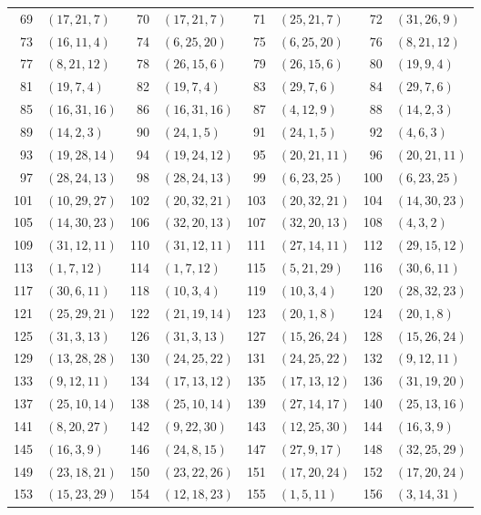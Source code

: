 \begin{longtable}{@{}r@{\quad}l@{\qquad}r@{\quad}l@{\qquad}r@{\quad}l@{\qquad}r@{\quad}l@{}}
69 & $(17,21,7)$ & 70 & $(17,21,7)$ & 71 & $(25,21,7)$ & 72 & $(31,26,9)$\\
73 & $(16,11,4)$ & 74 & $(6,25,20)$ & 75 & $(6,25,20)$ & 76 & $(8,21,12)$\\
77 & $(8,21,12)$ & 78 & $(26,15,6)$ & 79 & $(26,15,6)$ & 80 & $(19,9,4)$\\
81 & $(19,7,4)$ & 82 & $(19,7,4)$ & 83 & $(29,7,6)$ & 84 & $(29,7,6)$\\
85 & $(16,31,16)$ & 86 & $(16,31,16)$ & 87 & $(4,12,9)$ & 88 & $(14,2,3)$\\
89 & $(14,2,3)$ & 90 & $(24,1,5)$ & 91 & $(24,1,5)$ & 92 & $(4,6,3)$\\
93 & $(19,28,14)$ & 94 & $(19,24,12)$ & 95 & $(20,21,11)$ & 96 & $(20,21,11)$\\
97 & $(28,24,13)$ & 98 & $(28,24,13)$ & 99 & $(6,23,25)$ & 100 & $(6,23,25)$\\
101 & $(10,29,27)$ & 102 & $(20,32,21)$ & 103 & $(20,32,21)$ & 104 & $(14,30,23)$\\
105 & $(14,30,23)$ & 106 & $(32,20,13)$ & 107 & $(32,20,13)$ & 108 & $(4,3,2)$\\
109 & $(31,12,11)$ & 110 & $(31,12,11)$ & 111 & $(27,14,11)$ & 112 & $(29,15,12)$\\
113 & $(1,7,12)$ & 114 & $(1,7,12)$ & 115 & $(5,21,29)$ & 116 & $(30,6,11)$\\
117 & $(30,6,11)$ & 118 & $(10,3,4)$ & 119 & $(10,3,4)$ & 120 & $(28,32,23)$\\
121 & $(25,29,21)$ & 122 & $(21,19,14)$ & 123 & $(20,1,8)$ & 124 & $(20,1,8)$\\
125 & $(31,3,13)$ & 126 & $(31,3,13)$ & 127 & $(15,26,24)$ & 128 & $(15,26,24)$\\
129 & $(13,28,28)$ & 130 & $(24,25,22)$ & 131 & $(24,25,22)$ & 132 & $(9,12,11)$\\
133 & $(9,12,11)$ & 134 & $(17,13,12)$ & 135 & $(17,13,12)$ & 136 & $(31,19,20)$\\
137 & $(25,10,14)$ & 138 & $(25,10,14)$ & 139 & $(27,14,17)$ & 140 & $(25,13,16)$\\
141 & $(8,20,27)$ & 142 & $(9,22,30)$ & 143 & $(12,25,30)$ & 144 & $(16,3,9)$\\
145 & $(16,3,9)$ & 146 & $(24,8,15)$ & 147 & $(27,9,17)$ & 148 & $(32,25,29)$\\
149 & $(23,18,21)$ & 150 & $(23,22,26)$ & 151 & $(17,20,24)$ & 152 & $(17,20,24)$\\
153 & $(15,23,29)$ & 154 & $(12,18,23)$ & 155 & $(1,5,11)$ & 156 & $(3,14,31)$\\

\end{longtable}
